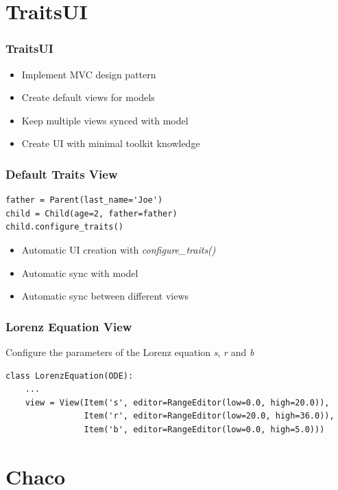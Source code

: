 \documentclass[14pt,compress]{beamer}
\begin{document}
\section{TraitsUI}

\begin{frame}
  \frametitle{TraitsUI}
  \begin{itemize}
      \item Implement MVC design pattern
      \item Create default views for models
      \item Keep multiple views synced with model
      \item Create UI with minimal toolkit knowledge
  \end{itemize}
\end{frame}

\begin{frame}
\frametitle{Default Traits View}
\begin{lstlisting}
father = Parent(last_name='Joe')
child = Child(age=2, father=father)
child.configure_traits()
\end{lstlisting}
\pause
\begin{itemize}
\item Automatic UI creation with \emph{configure\_traits()}
\item Automatic sync with model
\item Automatic sync between different views
\end{itemize}
\end{frame}

\begin{frame}
\frametitle{Lorenz Equation View}
Configure the parameters of the Lorenz equation \emph{s}, \emph{r} and \emph{b}
\scriptsize
\begin{lstlisting}
class LorenzEquation(ODE):
    ...
    view = View(Item('s', editor=RangeEditor(low=0.0, high=20.0)),
                Item('r', editor=RangeEditor(low=20.0, high=36.0)),
                Item('b', editor=RangeEditor(low=0.0, high=5.0)))
\end{lstlisting}
\end{frame}



\section{Chaco}
\end{document}

